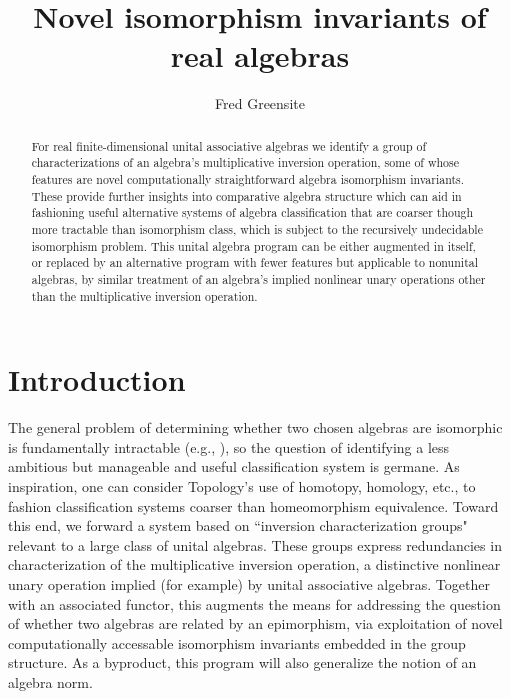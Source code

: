 \documentclass{amsart}
\numberwithin{equation}{section}
\theoremstyle{definition}
\numberwithin{theorem}{section}
\begin{document}
       
             \title{Novel isomorphism invariants of real algebras}
    \author{Fred Greensite}
    
   \begin{abstract}  For real finite-dimensional unital associative algebras we identify a group of characterizations of an algebra's multiplicative inversion operation, some of whose features are novel computationally straightforward algebra isomorphism invariants.  These provide further insights into comparative algebra structure which can aid in fashioning useful alternative systems of algebra classification that are coarser though more tractable than isomorphism class, which is subject to the recursively undecidable isomorphism problem.  This unital algebra program can be either augmented in itself, or replaced by an alternative program with fewer features but applicable to nonunital algebras, by similar treatment of an algebra's implied nonlinear unary operations other than the multiplicative inversion operation.
   \end{abstract}
        
  \maketitle
  
 
  \section{Introduction} The general problem of determining whether two chosen algebras are isomorphic is fundamentally intractable (e.g., \cite{drozd:1972,prest:1991,belitskii:2003}), so the question of identifying a  less ambitious but manageable and useful classification system is germane.  As inspiration, one can consider Topology's use of homotopy, homology, etc., to fashion classification systems coarser than homeomorphism equivalence.  Toward this end, we forward a system based on  ``inversion characterization groups" relevant to a large class of unital algebras.  These groups express redundancies in characterization of the multiplicative inversion operation, a distinctive nonlinear unary operation implied (for example) by unital associative algebras. Together with an associated functor, this augments the means for addressing the question of whether two algebras are related by an epimorphism, via exploitation of novel computationally accessable isomorphism invariants embedded in the group structure. 
    As a byproduct, this program will also generalize the notion of an algebra norm. 
  
\end{document}
